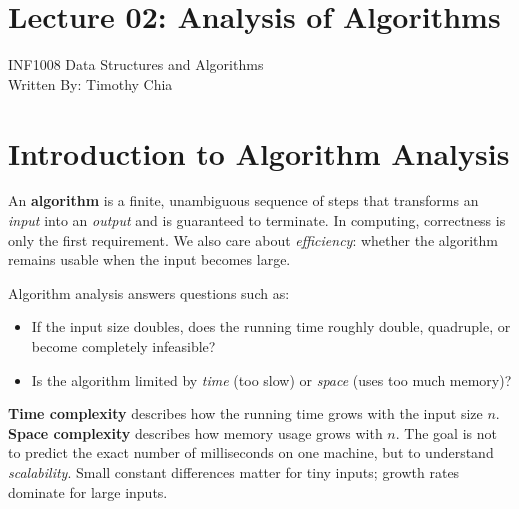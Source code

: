 \documentclass[12pt]{scrartcl}
\begin{document}




\section*{Lecture 02: Analysis of Algorithms}
INF1008 Data Structures and Algorithms \\
Written By: Timothy Chia

\vspace{0.2cm}
\tableofcontents
\vspace{0.2cm}

\newpage
\section{Introduction to Algorithm Analysis}
An \textbf{algorithm} is a finite, unambiguous sequence of steps that transforms an \emph{input} into an \emph{output} and is guaranteed to terminate. In computing, correctness is only the first requirement. We also care about \emph{efficiency}: whether the algorithm remains usable when the input becomes large.

Algorithm analysis answers questions such as:
\begin{itemize}[leftmargin=1.5em]
	\item If the input size doubles, does the running time roughly double, quadruple, or become completely infeasible?
	\item Is the algorithm limited by \emph{time} (too slow) or \emph{space} (uses too much memory)?
\end{itemize}

\textbf{Time complexity} describes how the running time grows with the input size \(n\). \textbf{Space complexity} describes how memory usage grows with \(n\). The goal is not to predict the exact number of milliseconds on one machine, but to understand \emph{scalability}. Small constant differences matter for tiny inputs; growth rates dominate for large inputs.
\end{document}
